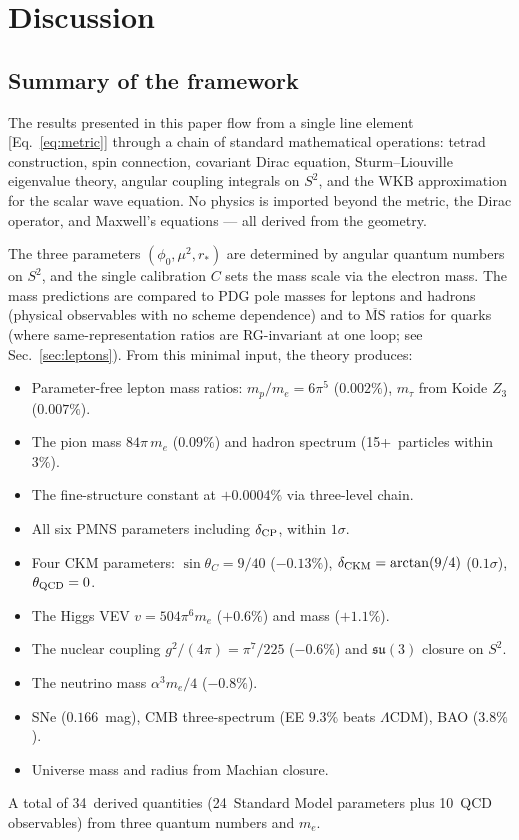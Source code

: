 \documentclass[aps,prd,twocolumn,superscriptaddress,nofootinbib,longbibliography]{revtex4-2}
\newcommand{\rstar}{r_{*}}
\newcommand{\phiz}{\phi_0}
\begin{document}
\section{Discussion}\label{sec:discussion}

\subsection{Summary of the framework}

The results presented in this paper flow from a single line element
[Eq.~\eqref{eq:metric}] through a chain of standard mathematical
operations: tetrad construction, spin connection, covariant Dirac
equation, Sturm--Liouville eigenvalue theory, angular coupling
integrals on $S^2$, and the WKB approximation for the scalar wave
equation.  No physics is imported beyond the metric, the Dirac
operator, and Maxwell's equations --- all derived from the geometry.

The three parameters $(\phiz, \mu^2, \rstar)$ are determined by
angular quantum numbers on $S^2$, and the single calibration $C$
sets the mass scale via the electron mass.  The mass predictions are
compared to PDG pole masses for leptons and hadrons (physical
observables with no scheme dependence) and to
$\overline{\mathrm{MS}}$ ratios for quarks (where
same-representation ratios are RG-invariant at one loop;
see Sec.~\ref{sec:leptons}).  From this minimal input, the theory
produces:
\begin{itemize}
\item Parameter-free lepton mass ratios: $m_p/m_e = 6\pi^5$
  ($0.002\%$), $m_\tau$ from Koide $Z_3$ ($0.007\%$).
\item The pion mass $84\pi\,m_e$ ($0.09\%$) and hadron spectrum
  (15+~particles within $3\%$).
\item The fine-structure constant at $+0.0004\%$ via three-level
  chain.
\item All six PMNS parameters including $\delta_{\rm CP}$, within
  $1\sigma$.
\item Four CKM parameters: $\sin\theta_C = 9/40$ ($-0.13\%$),
  $\delta_{\rm CKM} = \arctan(9/4)$ ($0.1\sigma$), $\theta_{\rm QCD}
  = 0$.
\item The Higgs VEV $v = 504\pi^6 m_e$ ($+0.6\%$) and mass
  ($+1.1\%$).
\item The nuclear coupling $g^2/(4\pi) = \pi^7/225$ ($-0.6\%$)
  and $\mathfrak{su}(3)$ closure on $S^2$.
\item The neutrino mass $\alpha^3 m_e/4$ ($-0.8\%$).
\item SNe ($0.166$~mag), CMB three-spectrum (EE $9.3\%$ beats
  $\Lambda$CDM), BAO ($3.8\%$).
\item Universe mass and radius from Machian closure.
\end{itemize}
A total of 34~derived quantities (24~Standard Model parameters plus
10~QCD observables) from three quantum numbers and $m_e$.
\end{document}
